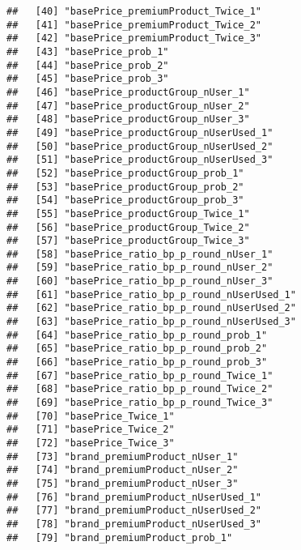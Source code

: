 \documentclass[10pt]{report}
\begin{document}
\begin{verbatim}
##   [40] "basePrice_premiumProduct_Twice_1"                     
##   [41] "basePrice_premiumProduct_Twice_2"                     
##   [42] "basePrice_premiumProduct_Twice_3"                     
##   [43] "basePrice_prob_1"                                     
##   [44] "basePrice_prob_2"                                     
##   [45] "basePrice_prob_3"                                     
##   [46] "basePrice_productGroup_nUser_1"                       
##   [47] "basePrice_productGroup_nUser_2"                       
##   [48] "basePrice_productGroup_nUser_3"                       
##   [49] "basePrice_productGroup_nUserUsed_1"                   
##   [50] "basePrice_productGroup_nUserUsed_2"                   
##   [51] "basePrice_productGroup_nUserUsed_3"                   
##   [52] "basePrice_productGroup_prob_1"                        
##   [53] "basePrice_productGroup_prob_2"                        
##   [54] "basePrice_productGroup_prob_3"                        
##   [55] "basePrice_productGroup_Twice_1"                       
##   [56] "basePrice_productGroup_Twice_2"                       
##   [57] "basePrice_productGroup_Twice_3"                       
##   [58] "basePrice_ratio_bp_p_round_nUser_1"                   
##   [59] "basePrice_ratio_bp_p_round_nUser_2"                   
##   [60] "basePrice_ratio_bp_p_round_nUser_3"                   
##   [61] "basePrice_ratio_bp_p_round_nUserUsed_1"               
##   [62] "basePrice_ratio_bp_p_round_nUserUsed_2"               
##   [63] "basePrice_ratio_bp_p_round_nUserUsed_3"               
##   [64] "basePrice_ratio_bp_p_round_prob_1"                    
##   [65] "basePrice_ratio_bp_p_round_prob_2"                    
##   [66] "basePrice_ratio_bp_p_round_prob_3"                    
##   [67] "basePrice_ratio_bp_p_round_Twice_1"                   
##   [68] "basePrice_ratio_bp_p_round_Twice_2"                   
##   [69] "basePrice_ratio_bp_p_round_Twice_3"                   
##   [70] "basePrice_Twice_1"                                    
##   [71] "basePrice_Twice_2"                                    
##   [72] "basePrice_Twice_3"                                    
##   [73] "brand_premiumProduct_nUser_1"                         
##   [74] "brand_premiumProduct_nUser_2"                         
##   [75] "brand_premiumProduct_nUser_3"                         
##   [76] "brand_premiumProduct_nUserUsed_1"                     
##   [77] "brand_premiumProduct_nUserUsed_2"                     
##   [78] "brand_premiumProduct_nUserUsed_3"                     
##   [79] "brand_premiumProduct_prob_1"                          

\end{verbatim}
\end{document}

